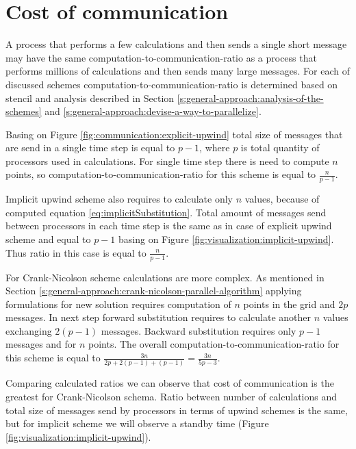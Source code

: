 \section{Cost of communication} \label{s:results:cost-of-communication}
	A process that performs a few calculations and then sends a single short message may have the same \gls{computation-to-communication-ratio} as a process that performs millions of calculations and then sends many large messages. For each of discussed schemes \gls{computation-to-communication-ratio} is determined based on \gls{stencil} and analysis described in Section \ref{s:general-approach:analysis-of-the-schemes} and \ref{s:general-approach:devise-a-way-to-parallelize}.
	
	Basing on Figure \ref{fig:communication:explicit-upwind} total size of messages that are send in a single time step is equal to $p-1$, where $p$ is total quantity of processors used in calculations. For single time step there is need to compute $n$ points, so \gls{computation-to-communication-ratio} for this scheme is equal to $\frac{n}{p-1}$.
	
	Implicit upwind scheme also requires to calculate only $n$ values, because of computed equation \eqref{eq:implicitSubstitution}. Total amount of messages send between processors in each time step is the same as in case of explicit upwind scheme and equal to $p-1$ basing on Figure \ref{fig:visualization:implicit-upwind}. Thus ratio in this case is equal to $\frac{n}{p-1}$.
	
	For Crank-Nicolson scheme calculations are more complex. As mentioned in Section \ref{s:general-approach:crank-nicolson-parallel-algorithm} applying formulations for new solution requires computation of $n$ points in the grid and $2p$ messages. In next step forward substitution requires to calculate another $n$ values exchanging $2(p-1)$ messages. Backward substitution requires only $p-1$ messages and for $n$ points. The overall \gls{computation-to-communication-ratio} for this scheme is equal to $\frac{3n}{2p + 2(p-1) + (p-1)} = \frac{3n}{5p-3}$.
	
	Comparing calculated ratios we can observe that cost of communication is the greatest for Crank-Nicolson schema. Ratio between number of calculations and total size of messages send by processors in terms of upwind schemes is the same, but for implicit scheme we will observe a standby time (Figure \ref{fig:visualization:implicit-upwind}).